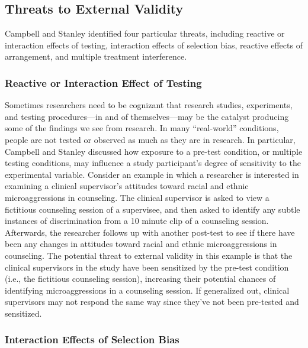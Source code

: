 \documentclass[
  11pt,
]{book}
\begin{document}
\subsection{Threats to External Validity}\label{threats-to-external-validity}

Campbell and Stanley \citeyearpar{campbell_experimental_1963} identified four particular threats, including reactive or interaction effects of testing, interaction effects of selection bias, reactive effects of arrangement, and multiple treatment interference.

\subsubsection{Reactive or Interaction Effect of Testing}\label{reactive-or-interaction-effect-of-testing}

Sometimes researchers need to be cognizant that research studies, experiments, and testing procedures---in and of themselves---may be the catalyst producing some of the findings we see from research. In many ``real-world'' conditions, people are not tested or observed as much as they are in research. In particular, Campbell and Stanley \citeyearpar{campbell_experimental_1963} discussed how exposure to a pre-test condition, or multiple testing conditions, may influence a study participant's degree of sensitivity to the experimental variable. Consider an example in which a researcher is interested in examining a clinical supervisor's attitudes toward racial and ethnic microaggressions in counseling. The clinical supervisor is asked to view a fictitious counseling session of a supervisee, and then asked to identify any subtle instances of discrimination from a 10 minute clip of a counseling session. Afterwards, the researcher follows up with another post-test to see if there have been any changes in attitudes toward racial and ethnic microaggressions in counseling. The potential threat to external validity in this example is that the clinical supervisors in the study have been sensitized by the pre-test condition (i.e., the fictitious counseling session), increasing their potential chances of identifying microaggressions in a counseling session. If generalized out, clinical supervisors may not respond the same way since they've not been pre-tested and sensitized.

\subsubsection{Interaction Effects of Selection Bias}\label{interaction-effects-of-selection-bias}
\end{document}
